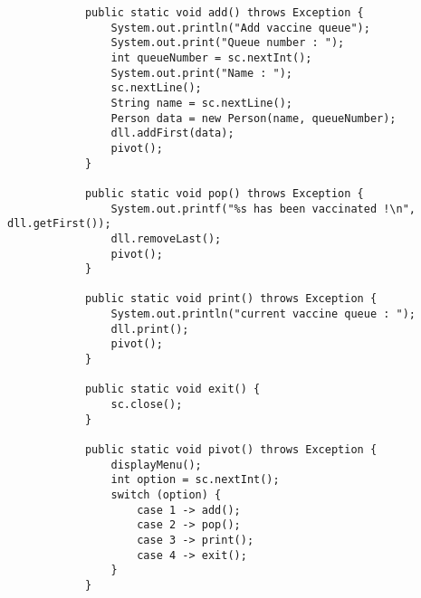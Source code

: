\documentclass[12pt,titlepage]{article}
\begin{document}
\begin{enumerate}
\begin{verbatim}
            public static void add() throws Exception {
                System.out.println("Add vaccine queue");
                System.out.print("Queue number : ");
                int queueNumber = sc.nextInt();
                System.out.print("Name : ");
                sc.nextLine();
                String name = sc.nextLine();
                Person data = new Person(name, queueNumber);
                dll.addFirst(data);
                pivot();
            }
            
            public static void pop() throws Exception {
                System.out.printf("%s has been vaccinated !\n", dll.getFirst());
                dll.removeLast();
                pivot();
            }

            public static void print() throws Exception {
                System.out.println("current vaccine queue : ");
                dll.print();
                pivot();
            }

            public static void exit() {
                sc.close();
            }
            
            public static void pivot() throws Exception {
                displayMenu();
                int option = sc.nextInt();
                switch (option) {
                    case 1 -> add();
                    case 2 -> pop();
                    case 3 -> print();
                    case 4 -> exit();
                }
            }
            

\end{verbatim}
\end{enumerate}
\end{document}
